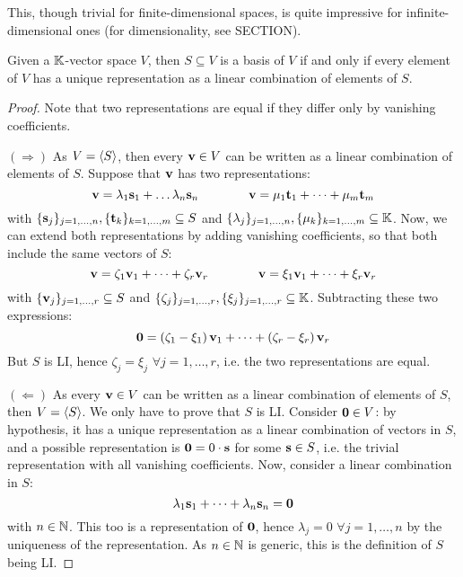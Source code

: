 This, though trivial for finite-dimensional spaces, is quite impressive for infinite-dimensional ones (for dimensionality, see SECTION).

\begin{proposition}{}{}
  Given a $ \mathbb{K} $-vector space $ V $, then $ S \subseteq V $ is a basis of $ V $ if and only if every element of $ V $ has a unique representation as a linear combination of elements of $ S $.
\end{proposition}

\begin{proofbox}
  \begin{proof}
    Note that two representations are equal if they differ only by vanishing coefficients.

    $ (\Rightarrow) $ As $ V = \braket{S} $, then every $ \mathbf{v} \in V $ can be written as a linear combination of elements of $ S $. Suppose that $ \mathbf{v} $ has two representations:
    \begin{equation*}
      \mathbf{v} = \lambda_1 \mathbf{s}_1 + \dots \lambda_n \mathbf{s}_n
      \qquad \qquad
      \mathbf{v} = \mu_1 \mathbf{t}_1 + \dots + \mu_m \mathbf{t}_m
    \end{equation*}
    with $ \{\mathbf{s}_j\}_{j = 1, \dots, n} , \{\mathbf{t}_k\}_{k = 1, \dots, m} \subseteq S $ and $ \{\lambda_j\}_{j = 1, \dots, n} , \{\mu_k\}_{k = 1, \dots, m} \subseteq \mathbb{K} $. Now, we can extend both representations by adding vanishing coefficients, so that both include the same vectors of $ S $:
    \begin{equation*}
      \mathbf{v} = \zeta_1 \mathbf{v}_1 + \dots + \zeta_r \mathbf{v}_r
      \qquad \qquad
      \mathbf{v} = \xi_1 \mathbf{v}_1 + \dots + \xi_r \mathbf{v}_r
    \end{equation*}
    with $ \{\mathbf{v}_j\}_{j = 1, \dots, r} \subseteq S $ and $ \{\zeta_j\}_{j = 1, \dots, r} , \{\xi_j\}_{j = 1, \dots, r} \subseteq \mathbb{K} $. Subtracting these two expressions:
    \begin{equation*}
      \mathbf{0} = \left( \zeta_1 - \xi_1 \right) \mathbf{v}_1 + \dots + \left( \zeta_r - \xi_r \right) \mathbf{v}_r
    \end{equation*}
    But $ S $ is LI, hence $ \zeta_j = \xi_j \,\,\forall j = 1, \dots, r $, i.e. the two representations are equal.

    $ (\Leftarrow) $ As every $ \mathbf{v} \in V $ can be written as a linear combination of elements of $ S $, then $ V = \braket{S} $. We only have to prove that $ S $ is LI. Consider $ \mathbf{0} \in V $: by hypothesis, it has a unique representation as a linear combination of vectors in $ S $, and a possible representation is $ \mathbf{0} = 0 \cdot \mathbf{s} $ for some $ \mathbf{s} \in S $, i.e. the trivial representation with all vanishing coefficients. Now, consider a linear combination in $ S $:
    \begin{equation*}
      \lambda_1 \mathbf{s}_1 + \dots + \lambda_n \mathbf{s}_n = \mathbf{0}
    \end{equation*}
    with $ n \in \mathbb{N} $. This too is a representation of $ \mathbf{0} $, hence $ \lambda_j = 0 \,\,\forall j = 1, \dots, n $ by the uniqueness of the representation. As $ n \in \mathbb{N} $ is generic, this is the definition of $ S $ being LI.
  \end{proof}
\end{proofbox}

